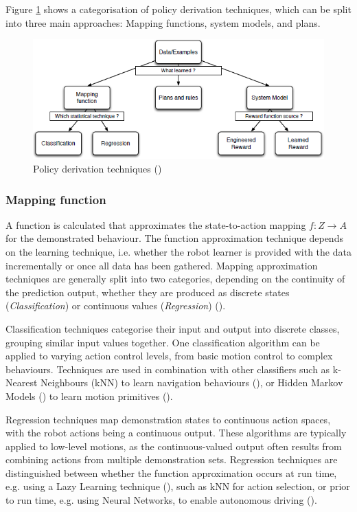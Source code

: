 Figure \ref{fig:Learning-techniques} shows a categorisation of policy derivation techniques, which can be split into three main approaches: Mapping functions, system models, and plans.

\begin{figure}[!h]
	\centering
	\includegraphics[scale=0.75]{figures/Learning-techniques}
	\caption{Policy derivation techniques (\cite{argall2009survey})}
	\label{fig:Learning-techniques}
\end{figure}


\subsubsection{Mapping function} 
A function is calculated that approximates the state-to-action mapping $f : Z \rightarrow A$ for the demonstrated behaviour. The function approximation technique depends on the learning technique, i.e. whether the robot learner is provided with the data incrementally or once all data has been gathered. Mapping approximation techniques are generally split into two categories, depending on the continuity of the prediction output, whether they are produced as discrete states (\textit{Classification}) or continuous values (\textit{Regression}) (\cite{argall2009survey}).

Classification techniques categorise their input and output into discrete classes, grouping similar input values together. One classification algorithm can be applied to varying action control levels, from basic motion control to complex behaviours. Techniques are used in combination with other classifiers such as k-Nearest Neighbours (kNN) to learn navigation behaviours (\cite{saunders2006teaching}), or Hidden Markov Models (\cite{hovland1996skill}) to learn motion primitives (\cite{rybski1999interactive}).

Regression techniques map demonstration states to continuous action spaces, with the robot actions being a continuous output. These algorithms are typically applied to low-level motions, as the continuous-valued output often results from combining actions from multiple demonstration sets. Regression techniques are distinguished between whether the function approximation occurs at run time, e.g. using a Lazy Learning technique (\cite{atkeson1997locally}), such as kNN for action selection, or prior to run time, e.g. using Neural Networks, to enable autonomous driving (\cite{pomerleau1991efficient}).

